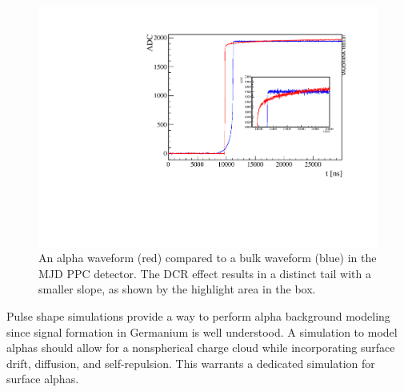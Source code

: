 \begin{figure}
\centering
  \includegraphics[width=0.6\linewidth]{ch3/figs/dcr_waveform.pdf}
 \caption{An alpha waveform (red) compared to a bulk waveform (blue) in the MJD PPC detector. The DCR effect results in a distinct tail with a smaller slope, as shown by the highlight area in the box.}
\label{fig:dcr_waveform}
  \end{figure}

Pulse shape simulations provide a way to perform alpha background modeling since signal formation in Germanium is well understood. A simulation to model alphas should allow for a nonspherical charge cloud while incorporating surface drift, diffusion, and self-repulsion. This warrants a dedicated simulation for surface alphas.






